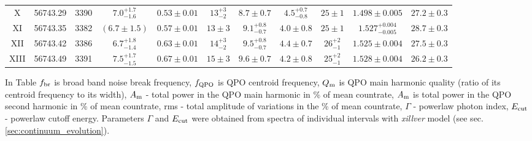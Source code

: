\documentclass[a4paper,fleqn,usenatbib]{mnras}
\begin{document}
\begin{table}
\begin{tabular}{|c|c|c|c|c|c|c|c|c|c|c|}
X & 56743.29 & 3390 & $7.0_{-1.6}^{+1.7}$ & $0.53\pm0.01$ & $13_{-2}^{+3}$ & $8.7\pm0.7$ & $4.5_{-0.8}^{+0.7}$ & $25\pm1$ & $1.498\pm0.005$ & $27.2\pm0.3$ \\
XI & 56743.35 & 3382 & $(6.7\pm1.5)$ & $0.57\pm0.01$ & $13\pm3$ & $9.1_{-0.7}^{+0.8}$ & $4.0\pm0.8$ & $25\pm1$ & $1.527_{-0.005}^{+0.004}$ & $28.7\pm0.3$ \\
XII & 56743.42 & 3386 & $6.7_{-1.4}^{+1.8}$ & $0.63\pm0.01$ & $14_{-2}^{+3}$ & $9.5_{-0.7}^{+0.8}$ & $4.4\pm0.7$ & $26_{-1}^{+2}$ & $1.525\pm0.004$ & $27.5\pm0.3$ \\
XIII & 56743.49 & 3391 & $7.5_{-1.5}^{+1.7}$ & $0.67\pm0.01$ & $15\pm3$ & $9.6\pm0.7$ & $4.2\pm0.8$ & $25_{-1}^{+2}$ & $1.528\pm0.004$ & $26.2\pm0.3$ \\
\hline
\end{tabular}
\begin{flushleft}
        In Table $f_{\rm br}$ is broad band noise break frequency, $f_{\rm QPO}$ is QPO centroid frequency, $Q_{\rm m}$ is QPO main harmonic quality (ratio of its centroid frequency to its width), $A_{\rm m}$ - total power in the QPO main harmonic in \% of mean countrate, $A_{\rm m}$ is total power in the QPO second harmonic in \% of mean countrate, rms - total amplitude of variations in the \% of mean countrate, $\Gamma$ - powerlaw photon index, $E_{\rm cut}$ - powerlaw cutoff energy. Parameters $\Gamma$ and $E_{\rm cut}$ were obtained from spectra of individual intervals with {\it xillver} model (see sec.\ref{sec:continuum_evolution}).
\end{flushleft}
\end{table}

\end{document}
